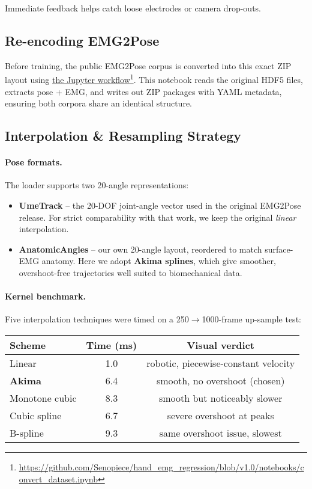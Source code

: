 Immediate feedback helps catch loose electrodes or camera drop-outs.

\subsection{Re-encoding EMG2Pose}
Before training, the public EMG2Pose corpus is converted into this exact ZIP layout using \href{https://github.com/Senopiece/hand_emg_regression/blob/v1.0/notebooks/convert_dataset.ipynb}{the Jupyter workflow}\footnote{\url{https://github.com/Senopiece/hand_emg_regression/blob/v1.0/notebooks/convert_dataset.ipynb}}. This notebook reads the original HDF5 files, extracts pose + EMG, and writes out ZIP packages with YAML metadata, ensuring both corpora share an identical structure.

\subsection{Interpolation \& Resampling Strategy}

\paragraph{Pose formats.}
The loader supports two 20-angle representations:

\begin{itemize}
  \item \textbf{UmeTrack} -- the 20-DOF joint-angle vector used in the original
        EMG2Pose release. For strict comparability with that work, we keep the
        original \emph{linear} interpolation.
  \item \textbf{AnatomicAngles} -- our own 20-angle layout, reordered to match
        surface-EMG anatomy. Here we adopt \textbf{Akima splines}, which give
        smoother, overshoot-free trajectories well suited to biomechanical
        data.
\end{itemize}

\paragraph{Kernel benchmark.}
Five interpolation techniques were timed on a 250$\to$1000-frame up-sample test:

\begin{center}\small
\begin{tabular}{@{}lcc@{}}
\toprule
Scheme            & Time (ms) & Visual verdict \\ \midrule
Linear            & 1.0  & robotic, piecewise-constant velocity \\
\textbf{Akima}    & 6.4  & smooth, no overshoot (chosen) \\
Monotone cubic    & 8.3  & smooth but noticeably slower \\
Cubic spline      & 6.7  & severe overshoot at peaks \\
B-spline          & 9.3  & same overshoot issue, slowest \\ \bottomrule
\end{tabular}
\end{center}

